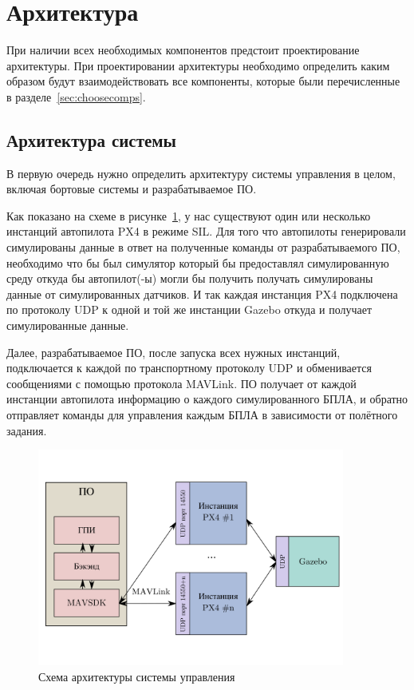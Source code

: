 \documentclass[specification,annotation]{itmo-student-thesis}
\begin{document}
\section{Архитектура}\label{sec:archsys}

При наличии всех необходимых компонентов предстоит проектирование архитектуры.
При проектировании архитектуры необходимо определить каким образом будут
взаимодействовать все компоненты, которые были перечисленные в
разделе~\ref{sec:choosecomps}.

\subsection{Архитектура системы}\label{subsec:archsys}

В первую очередь нужно определить архитектуру системы управления в целом,
включая бортовые системы и разрабатываемое ПО.

Как показано на схеме в рисунке~\ref{pic:diag-arch-sys}, у нас существуют один
или несколько инстанций автопилота PX4 в режиме SIL. Для того что автопилоты
генерировали симулированы данные в ответ на полученные команды от
разрабатываемого ПО, необходимо что бы был симулятор который бы предоставлял
симулированную среду откуда бы автопилот(-ы) могли бы получить получать
симулированы данные от симулированных датчиков. И так каждая инстанция PX4
подключена по протоколу UDP к одной и той же инстанции Gazebo откуда и получает
симулированные данные.

Далее, разрабатываемое ПО, после запуска всех нужных инстанций, подключается к
каждой по транспортному протоколу UDP и обменивается сообщениями с помощью
протокола MAVLink. ПО получает от каждой инстанции автопилота информацию о
каждого симулированного БПЛА, и обратно отправляет команды для управления каждым
БПЛА в зависимости от полётного задания.

\begin{figure}[!h]
  \caption{Схема архитектуры системы управления}\label{pic:diag-arch-sys}
  \centering
  \includegraphics[width=0.9\textwidth]{diag-arch-sys}
\end{figure}
\end{document}
